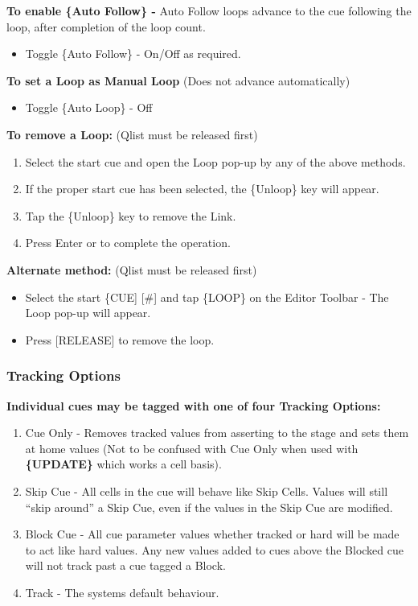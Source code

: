 \documentclass[
]{article}
\providecommand{\tightlist}{%
  \setlength{\itemsep}{0pt}\setlength{\parskip}{0pt}}
\begin{document}
\textbf{To enable \{Auto Follow\} -} Auto Follow loops advance to the cue following the loop, after completion of the loop count.

\begin{itemize}
\tightlist
\item
  Toggle \{Auto Follow\} - On/Off as required.
\end{itemize}

\textbf{To set a Loop as Manual Loop} (Does not advance automatically)

\begin{itemize}
\tightlist
\item
  Toggle \{Auto Loop\} - Off
\end{itemize}

\textbf{To remove a Loop:} (Qlist must be released first)

\begin{enumerate}
\def\labelenumi{\arabic{enumi}.}
\item
  Select the start cue and open the Loop pop-up by any of the above methods.
\item
  If the proper start cue has been selected, the \{Unloop\} key will appear.
\item
  Tap the \{Unloop\} key to remove the Link.
\item
  Press Enter or to complete the operation.
\end{enumerate}

\textbf{Alternate method:} (Qlist must be released first)

\begin{itemize}
\item
  Select the start \{CUE{]} {[}\#{]} and tap \{LOOP\} on the Editor Toolbar - The Loop pop-up will appear.
\item
  Press {[}RELEASE{]} to remove the loop.
\end{itemize}

\hypertarget{tracking-options}{%
\subsubsection{Tracking Options}\label{tracking-options}}

\textbf{Individual cues may be tagged with one of four Tracking Options:}

\begin{enumerate}
\def\labelenumi{\arabic{enumi}.}
\item
  Cue Only - Removes tracked values from asserting to the stage and sets them at home values (Not to be confused with Cue Only when used with \textbf{\{UPDATE\}} which works a cell basis).
\item
  Skip Cue - All cells in the cue will behave like Skip Cells. Values will still ``skip around'' a Skip Cue, even if the values in the Skip Cue are modified.
\item
  Block Cue - All cue parameter values whether tracked or hard will be made to act like hard values. Any new values added to cues above the Blocked cue will not track past a cue tagged a Block.
\item
  Track - The systems default behaviour.
\end{enumerate}
\end{document}
